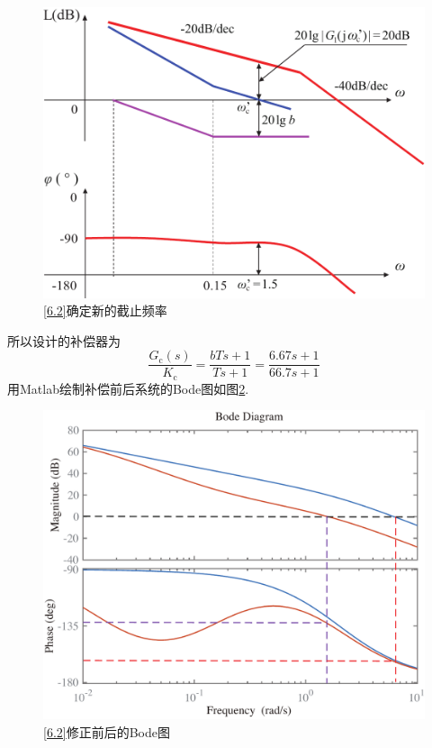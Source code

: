 \begin{figure}[!htb]
	\centering
	\includegraphics[width=0.6\linewidth]{pic/6.2.2.pdf}
	\vspace*{-1em}
	\caption{\ref{6.2}确定新的截止频率}
	\label{F6.2.2}
\end{figure}
所以设计的补偿器为
\[
\dfrac{G_\text{c}(s)}{K_\text{c}} =  \dfrac{bTs + 1}{Ts + 1} = \dfrac{6.67s + 1}{66.7s + 1}
\]
用Matlab绘制补偿前后系统的Bode图如图\ref{F6.2.3}.
\begin{figure}[!htb]
	\centering
	\includegraphics[width=0.6\linewidth]{pic/6.2.3.pdf}
	\vspace*{-1em}
	\caption{\ref{6.2}修正前后的Bode图}
	\label{F6.2.3}
\end{figure}

